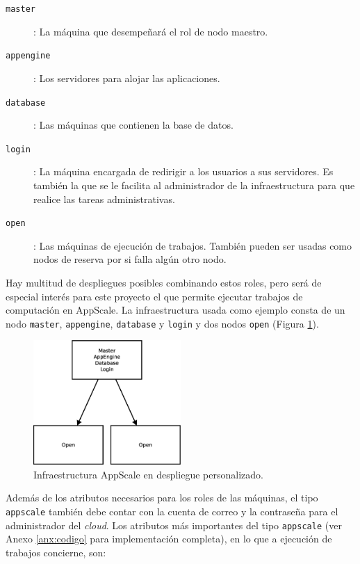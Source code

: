 \begin{description}
\item[\texttt{master}]: La máquina que desempeñará el rol de nodo maestro.
\item[\texttt{appengine}]: Los servidores para alojar las aplicaciones.
\item[\texttt{database}]: Las máquinas que contienen la base de datos.
\item[\texttt{login}]: La máquina encargada de redirigir a los usuarios a sus servidores. Es también la que se le facilita al administrador de la infraestructura para que realice las tareas administrativas.
\item[\texttt{open}]: Las máquinas de ejecución de trabajos. También pueden ser usadas como nodos de reserva por si falla algún otro nodo.
\end{description}

Hay multitud de despliegues posibles combinando estos roles, pero será de especial interés para este proyecto el que permite ejecutar trabajos de computación en AppScale. La infraestructura usada como ejemplo consta de un nodo \texttt{master}, \texttt{appengine}, \texttt{database} y \texttt{login} y dos nodos \texttt{open} (Figura \ref{figure:arquitectura-appscale}).

\begin{figure} [!htbp]
  \centering
  \includegraphics[width=0.5\textwidth]{figuras/Arquitectura_AppScale.eps}
  \caption{Infraestructura AppScale en despliegue personalizado.}
\label{figure:arquitectura-appscale}
\end{figure}

Además de los atributos necesarios para los roles de las máquinas, el tipo \texttt{appscale} también debe contar con la cuenta de correo y la contraseña para el administrador del \emph{cloud}. Los atributos más importantes del tipo \texttt{appscale} (ver Anexo \ref{anx:codigo} para implementación completa), en lo que a ejecución de trabajos concierne, son:

